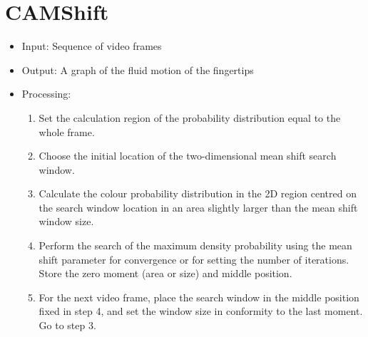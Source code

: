 \documentclass{scrreprt}
\begin{document}
\section{CAMShift}
\begin{itemize}
    \item Input: Sequence of video frames
    \item Output: A graph of the fluid motion of the fingertips
    \item Processing:
    \begin{enumerate}
        \item Set the calculation region of the probability distribution equal to the whole frame.
        \item Choose the initial location of the two-dimensional mean shift search window.
        \item Calculate the colour probability distribution in the 2D region centred on the search window location in an area slightly larger than the mean shift window size.
        \item Perform the search of the maximum density probability using the mean shift parameter for convergence or for setting the number of iterations. Store the zero moment (area or size) and middle position.
        \item For the next video frame, place the search window in the middle position fixed in step 4, and set the window size in conformity to the last moment. Go to step 3. 
    \end{enumerate}
\end{itemize}
\end{document}
